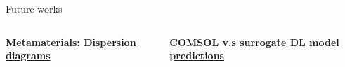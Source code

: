 \documentclass[10pt,aspectratio=169,dvipsnames]{beamer} %
\begin{document}
	\begin{frame}{Future works}
		\begin{columns}[T]
			\begin{column}[t]{0.49\textwidth}
				\centering
				\textbf{\underline{Metamaterials: Dispersion diagrams}}
				\begin{figure}
					\centering
				\end{figure}
			\end{column}
			\begin{column}[t]{0.49\textwidth}
				\centering
				\textbf{\underline{COMSOL v.s surrogate DL model predictions}}
				\begin{figure}
					\centering
				\end{figure}			
			\end{column}		
		\end{columns}				
	\end{frame}		
\end{document}
